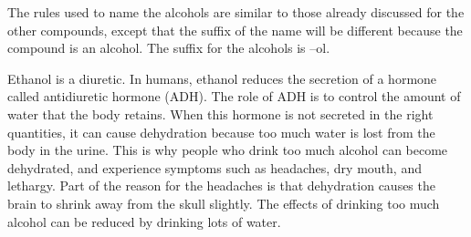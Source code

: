 The rules used to name the alcohols are similar to those already discussed for the other compounds, except that the suffix of the name will be different because the compound is an alcohol. The suffix for the alcohols is --ol.


\begin{IFact}{
Ethanol is a diuretic. In humans, ethanol reduces the secretion of a hormone called antidiuretic hormone (ADH). The role of ADH is to control the amount of water that the body retains. When this hormone is not secreted in the right quantities, it can cause dehydration because too much water is lost from the body in the urine. This is why people who drink too much alcohol can become dehydrated, and experience symptoms such as headaches, dry mouth, and lethargy. Part of the reason for the headaches is that dehydration causes the brain to shrink away from the skull slightly. The effects of drinking too much alcohol can be reduced by drinking lots of water.}
\end{IFact}


